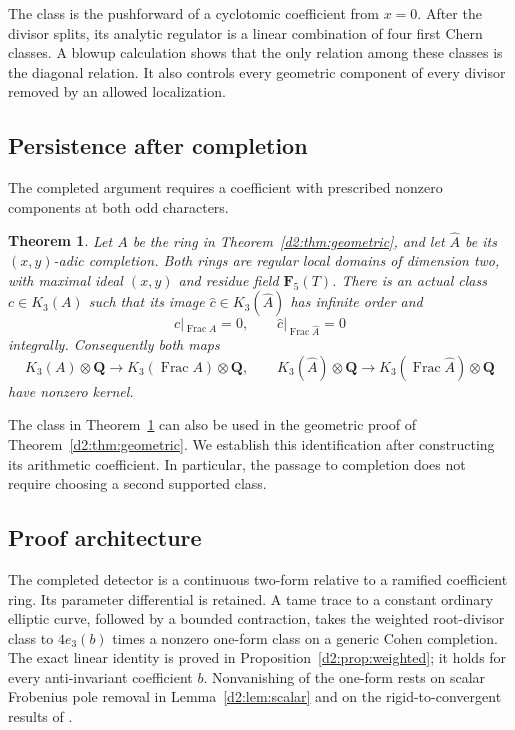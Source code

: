 \documentclass[11pt,a4paper]{amsart}
\numberwithin{equation}{section}
\newtheorem{theorem}{Theorem}[section]
\theoremstyle{definition}
\theoremstyle{remark}
\newcommand{\DtwoQQ}{\mathbf{Q}}
\newcommand{\DtwoFF}{\mathbf{F}}
\newcommand{\Dtwowh}{\widehat}
\DeclareMathOperator{\DtwoFrac}{Frac}
\begin{document}
The class is the pushforward of a cyclotomic coefficient from \(x=0\).
After the divisor splits, its analytic regulator is a linear combination
of four first Chern classes. A blowup calculation shows that the only
relation among these classes is the diagonal relation. It also controls
every geometric component of every divisor removed by an allowed
localization.

\subsection{Persistence after completion}

The completed argument requires a coefficient with prescribed nonzero
components at both odd characters.

\begin{theorem}\label{d2:thm:completed}
Let \(A\) be the ring in Theorem~\ref{d2:thm:geometric}, and let
\(\Dtwowh A\) be its \((x,y)\)-adic completion. Both rings are regular local
domains of dimension two, with maximal ideal \((x,y)\) and residue field
\(\DtwoFF _5(T)\). There is an actual class \(c\in K_3(A)\) such that its image
\(\Dtwowh c\in K_3(\Dtwowh A)\) has infinite order and
\[
 c|_{\DtwoFrac A}=0,
 \qquad
 \Dtwowh c|_{\DtwoFrac\Dtwowh A}=0
\]
integrally. Consequently both maps
\[
 K_3(A)\otimes\DtwoQQ\longrightarrow K_3(\DtwoFrac A)\otimes\DtwoQQ,
 \qquad
 K_3(\Dtwowh A)\otimes\DtwoQQ\longrightarrow
 K_3(\DtwoFrac\Dtwowh A)\otimes\DtwoQQ
\]
have nonzero kernel.
\end{theorem}

The class in Theorem~\ref{d2:thm:completed} can also be used in the geometric
proof of Theorem~\ref{d2:thm:geometric}. We establish this identification
after constructing its arithmetic coefficient. In particular, the
passage to completion does not require choosing a second supported
class.

\subsection*{Proof architecture}

The completed detector is a continuous two-form relative to a ramified
coefficient ring. Its parameter differential is retained. A tame trace
to a constant ordinary elliptic curve, followed by a bounded contraction,
takes the weighted root-divisor class to
\(4e_3(b)\) times a nonzero one-form class on a generic Cohen completion.
The exact linear identity is proved in
Proposition~\ref{d2:prop:weighted}; it holds for every anti-invariant
coefficient \(b\). Nonvanishing of the one-form rests on scalar
Frobenius pole removal in Lemma~\ref{d2:lem:scalar} and on the
rigid-to-convergent results of \cite{CaroDAddezio2025}.
\end{document}
